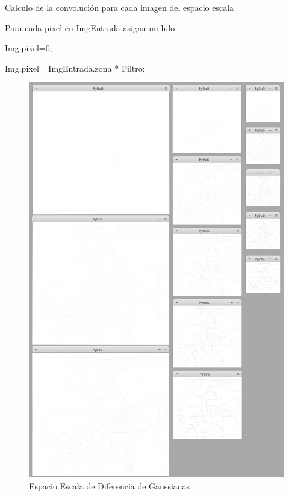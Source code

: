 \begin{algorithm}[H]
\caption{Calculo de la convolución para cada imagen del espacio escala}
 Para cada pixel en ImgEntrada asigna un hilo\;
 
 {
	{
		Img.pixel=0;
	}{
		
		Img.pixel= ImgEntrada.zona * Filtro; 
		\\
		}
 }
	

\end{algorithm}
\begin{figure}[ph]
			\centering
				\includegraphics[scale=0.45]{img/pyDoGT.jpg}
			\caption{Espacio Escala de Diferencia de Gaussianas}
\end{figure}

